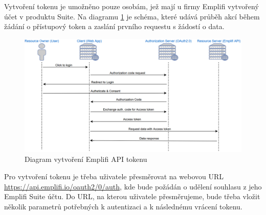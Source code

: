 \documentclass[czech, bc, kiv, he, iso690numb]{fasthesis}
\begin{document}
Vytvoření tokenu je umožněno pouze osobám, jež mají u firmy Emplifi vytvořený účet v produktu Suite. Na diagramu \ref{fig:emplifAPIDiagram} je schéma, které udává průběh akcí během žádání o 
přístupový token a zaslání prvního requestu s žádostí o data.
\begin{figure}
	\centering
	\includegraphics[width=1\textwidth]{pictures/emplifiAPI.png}
	\caption{Diagram vytvoření Emplifi API tokenu \cite{emplifiDocs}}
	\label{fig:emplifAPIDiagram}
\end{figure}

Pro vytvoření tokenu je třeba uživatele přesměrovat na webovou URL \url{https://api.emplifi.io/oauth2/0/auth}, kde bude požádán o udělení souhlasu z jeho Emplifi Suite účtu.
Do URL, na kterou uživatele přesměrujeme, bude třeba vložit několik parametrů potřebných k autentizaci a k následnému vrácení tokenu. 
\end{document}
